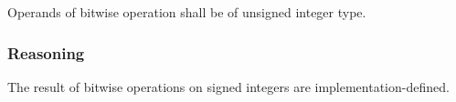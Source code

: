 \documentclass{article}
\begin{document}
Operands of bitwise operation shall be of unsigned integer type.

\subsubsection{Reasoning}

The result of bitwise operations on signed integers are implementation-defined.





\end{document}
